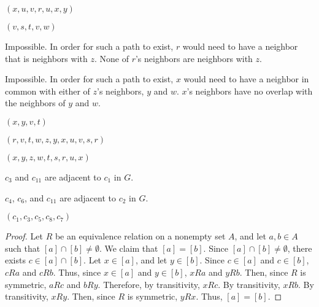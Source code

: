 \documentclass[12pt]{article}
\begin{document}
    $(x, u, v, r, u, x, y)$


    $(v, s, t, v, w)$


    Impossible. In order for such a path to exist, $r$ would need to have a neighbor that is neighbors with $z$. None of $r$'s neighbors are neighbors with $z$.


    Impossible. In order for such a path to exist, $x$ would need to have a neighbor in common with either of $z$'s neighbors, $y$ and $w$. $x$'s neighbors have no overlap with the neighbors of $y$ and $w$.


    $(x, y, v, t)$


    $(r, v, t, w, z, y, x, u, v, s, r)$


    $(x, y, z, w, t, s, r, u, x)$

\newpage
{}


    $c_3$ and $c_{11}$ are adjacent to $c_1$ in $G$.


    $c_4$, $c_6$, and $c_{11}$ are adjacent to $c_2$ in $G$.




    $(c_1, c_3, c_5, c_8, c_7)$

\bigskip
\begin{proof}
    Let $R$ be an equivalence relation on a nonempty set $A$, and let $a,b \in A$ such that $[a] \cap [b] \neq \emptyset$.
    We claim that $[a] = [b]$.
    Since $[a] \cap [b] \neq \emptyset$, there exists $c \in [a] \cap [b]$.
    Let $x \in [a]$, and let $y \in [b]$.
    Since $c \in [a]$ and $c \in [b]$, $c R a$ and $c R b$.
    Thus, since $x \in [a]$ and $y \in [b]$, $x R a$ and $y R b$.
    Then, since $R$ is symmetric, $a R c$ and $b R y$.
    Therefore, by transitivity, $x R c$.
    By transitivity, $x R b$. %
    By transitivity, $x R y$.
    Then, since $R$ is symmetric, $y R x$.
    Thus, $[a] = [b]$.
\end{proof}
\end{document}
